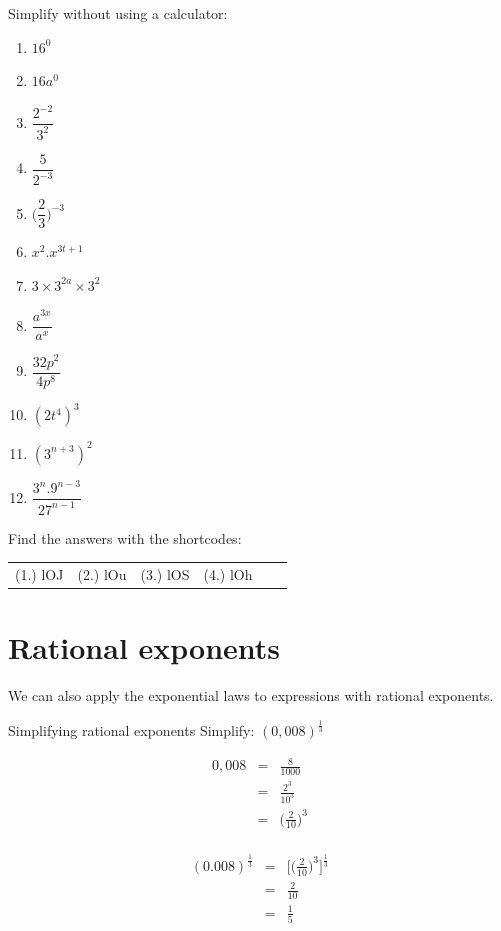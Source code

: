 \begin{exercises}{}{
Simplify without using a calculator:
\begin{multicols}{2}
\begin{enumerate}[label=\textbf{\arabic*}., itemsep=5pt]
 \item $16^0$
 \item $16a^0$
 \item $\dfrac{2^{-2}}{3^2}$
 \item $ \dfrac{5}{2^{-3}}$
 \item $ \Big(\dfrac{2}{3}\Big)^{-3} $
 \item $ x^2 . x^{3t+1} $
 \item $ 3 \times 3^{2a} \times 3^2$
 \item $ \dfrac{a^{3x}}{a^x} $
 \item $ \dfrac{32p^2}{4p^8}$
 \item $ (2t^4)^3$
 \item $ (3^{n+3})^2$
 \item $ \dfrac{3^n . 9^{n-3}}{27^{n-1}}$
\end{enumerate}
\end{multicols}
\practiceinfo
{} Find the answers with the shortcodes:
\begin{tabular}[h]{cccccc}
(1.) lOJ  &  (2.) lOu  &  (3.) lOS  &  (4.) lOh  & 
\end{tabular}
}
\end{exercises}

\section{Rational exponents}

We can also apply the exponential laws to expressions with rational exponents.
\begin{wex}
{%
Simplifying rational exponents
} 
{%
Simplify: 
$ (0,008)^{\frac{1}{3}}$
}
{%

\begin{eqnarray*}
 0,008 & = & \frac{8}{1000} \\
       & = & \frac{2^3}{10^3} \\
       & = & \Big(\frac{2}{10}\Big)^3\\
\end{eqnarray*}

\begin{eqnarray*}
 (0.008)^{\frac{1}{3}} & = & \Big[\Big(\frac{2}{10}\Big)^3\Big]^{\frac{1}{3}} \\
		 & = & \frac{2}{10} \\
		 & = & \frac{1}{5}
\end{eqnarray*}
}
\end{wex}


